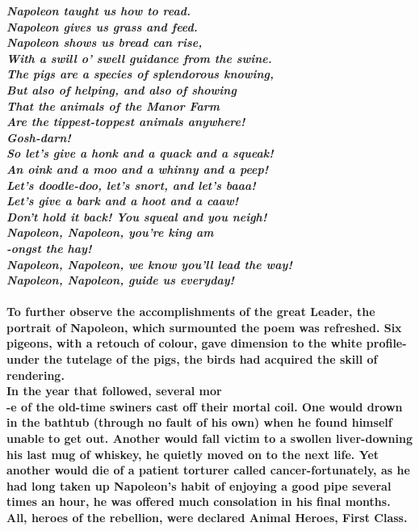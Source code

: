 \documentclass{book}
\begin{document}
\LARGE{\textbf{\textit{Napoleon taught us how to read.\\
		Napoleon gives us grass and feed.\\
		Napoleon shows us bread can rise,\\
		With a swill o' swell guidance from the swine.\\
		The pigs are a species of splendorous knowing,\\
		But also of helping, and also of
		showing\\
		That the animals of the Manor Farm\\
		Are the tippest-toppest animals anywhere!\\
	    Gosh-darn!\\
		So let's give a honk and a quack and a squeak!\\
		An oink and a moo and a whinny and a peep!\\
		Let's doodle-doo, let's snort, and let's baaa!\\
		Let's give a bark and a hoot and a caaw!\\
		Don't hold it back! You squeal and you neigh!\\
		Napoleon, Napoleon,
		you're king am\\
		-ongst the hay!\\
		Napoleon, Napoleon, we know you'll lead the way!\\
Napoleon, Napoleon, guide us everyday!\\\\}}
\LARGE{\textbf{To further observe the accomplishments of the great
	Leader, the portrait of Napoleon, which surmounted the poem
	was refreshed. Six pigeons, with a retouch of colour, gave
	dimension to the white profile-under the tutelage of the pigs,
	the birds had acquired the skill of rendering.\\
	In the year that followed, several mor\\
	-e of the
	old-time swiners	cast off their mortal coil.
	One would drown in the bathtub (through no
	fault of his own)
	when he found himself unable to get out.
	Another would fall victim to a swollen liver-downing
	his last mug of whiskey,
	he quietly moved on to the next life.
	Yet another would die
	of a patient torturer called
	cancer-fortunately, as he had long taken
	up Napoleon's habit of enjoying a good pipe
	several times an hour,
	he was offered much consolation in his
	final months. All, heroes of the
	rebellion, were declared Animal Heroes,
	First Class.\\\\
}}}
\end{document}
